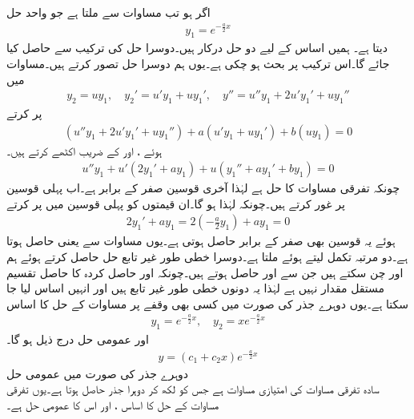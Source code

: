 اگر  ہو تب مساوات  سے  ملتا ہے جو واحد حل
\begin{align*}
y_1=e^{-\frac{a}{2}x}
\end{align*}
دیتا ہے۔ ہمیں اساس کے لیے دو حل درکار ہیں۔دوسرا حل  کی ترکیب سے حاصل کیا جائے گا۔اس ترکیب پر بحث ہو چکی ہے۔یوں ہم دوسرا حل  تصور کرتے ہیں۔مساوات  میں
\begin{align*}
y_2=uy_1,\quad y_2'=u'y_1+uy_1',\quad y''=u''y_1+2u'y_1'+uy_1''
\end{align*}
پر کرتے
\begin{align*}
(u''y_1+2u'y_1'+uy_1'')+a(u'y_1+uy_1')+b(uy_1)=0
\end{align*}
ہوئے ،  اور  کے  ضریب  اکٹھے کرتے ہیں۔
\begin{align}\label{مساوات_سادہ_دو_درجی_دوہرا_جذر_الف}
u'' y_1+u'(2y_1'+ay_1)+u(y_1''+ay_1'+by_1)=0
\end{align}
چونکہ  تفرقی مساوات کا حل ہے لہٰذا آخری قوسین صفر کے برابر  ہے۔اب پہلی قوسین پر غور کرتے ہیں۔چونکہ  لہٰذا  ہو گا۔ان قیمتوں کو پہلی قوسین میں پر کرتے
\begin{align*}
2y_1'+ay_1=2(-\frac{a}{2}y_1)+ay_1=0
\end{align*}
ہوئے یہ قوسین بھی صفر کے برابر حاصل ہوتی ہے۔یوں مساوات  سے  یعنی  حاصل ہوتا ہے۔دو مرتبہ تکمل لیتے ہوئے  ملتا ہے۔دوسرا خطی طور غیر تابع حل  حاصل کرتے ہوئے ہم  اور  چن سکتے ہیں جن سے
  اور  حاصل ہوتے ہیں۔چونکہ  اور حاصل کردہ  کا حاصل تقسیم مستقل مقدار نہیں ہے لہٰذا یہ دونوں خطی طور غیر تابع ہیں اور انہیں اساس لیا جا سکتا ہے۔یوں دوہرے جذر کی صورت میں کسی بھی وقفے پر مساوات  کے حل کا اساس 
\begin{align*}
y_1=e^{-\frac{a}{2}x}, \quad y_2=xe^{-\frac{a}{2}x}
\end{align*}
اور عمومی حل درج ذیل ہو گا۔
\begin{align}
y=(c_1 +c_2 x)e^{-\frac{a}{2}x}
\end{align}
\quad دوہرے جذر کی صورت میں عمومی حل\\
سادہ تفرقی مساوات  کی امتیازی مساوات  ہے جس کو  لکھ کر دوہرا جذر  حاصل ہوتا ہے۔یوں تفرقی مساوات کے حل کا اساس ،  اور اس کا عمومی حل  ہے۔

